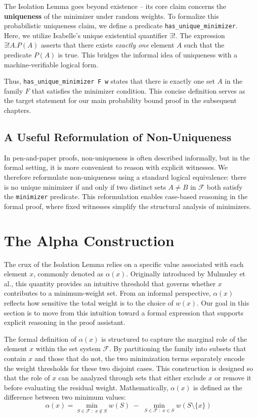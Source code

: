 The Isolation Lemma goes beyond existence -- its core claim concerns the \textbf{uniqueness} of the minimizer under random weights.
To formalize this probabilistic uniqueness claim, we define a predicate \texttt{has\_unique\_minimizer}.
Here, we utilize Isabelle's unique existential quantifier $\exists!$.
The expression $\exists! A. P(A)$ asserts that there exists \textit{exactly one} element $A$ such that the predicate $P(A)$ is true.
This bridges the informal idea of uniqueness with a machine-verifiable logical form.

Thus, \texttt{has\_unique\_minimizer F w} states that there is exactly one set $A$ in the family $F$ that satisfies the minimizer condition.
This concise definition serves as the target statement for our main probability bound proof in the subsequent chapters.

\subsection*{A Useful Reformulation of Non-Uniqueness}

In pen-and-paper proofs, non-uniqueness is often described informally, but in the formal setting, it is more convenient to reason with explicit witnesses.
We therefore reformulate non-uniqueness using a standard logical equivalence: there is no unique minimizer if and only if two distinct sets $A \ne B$ in $\mathcal{F}$ both satisfy the \texttt{minimizer} predicate.
This reformulation enables case-based reasoning in the formal proof, where fixed witnesses simplify the structural analysis of minimizers.

\section{The Alpha Construction}
\label{sec:alpha_construction}

The crux of the Isolation Lemma relies on a specific value associated with each element $x$, commonly denoted as $\alpha(x)$.
Originally introduced by Mulmuley et al., this quantity provides an intuitive threshold that governs whether $x$ contributes to a minimum-weight set.
From an informal perspective, $\alpha(x)$ reflects how sensitive the total weight is to the choice of $w(x)$.
Our goal in this section is to move from this intuition toward a formal expression that supports explicit reasoning in the proof assistant.

The formal definition of $\alpha(x)$ is structured to capture the marginal role of the element $x$ within the set system $\mathcal{F}$. 
By partitioning the family into subsets that contain $x$ and those that do not, the two minimization terms separately encode the weight thresholds for these two disjoint cases. 
This construction is designed so that the role of $x$ can be analyzed through sets that either exclude $x$ or remove it before evaluating the residual weight.
Mathematically, $\alpha(x)$ is defined as the difference between two minimum values:
\begin{equation}
    \alpha(x)
    =
    \min_{S \in \mathcal{F} \;:\; x \notin S} w(S)
    \;-\;
    \min_{S \in \mathcal{F} \;:\; x \in S}
    w(S \setminus \{x\})
\end{equation}

